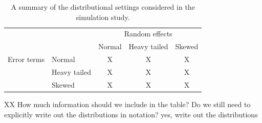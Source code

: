 \documentclass[12pt]{article} %
\newcommand{\hh}[1]{{\color{orange} #1}}
\newcommand{\al}[1]{{\color{red} #1}}
\begin{document}
\begin{table}[htdp]
\centering
\caption{\label{tab:simdsns} A summary of the distributional settings considered in the simulation study.}
\begin{tabular}{llccc}\hline
& & \multicolumn{3}{c}{Random effects} \\ 
           & & Normal & Heavy tailed & Skewed \\ \hline
Error terms  & Normal       & X & X & X \\
             & Heavy tailed & X & X & X \\
             & Skewed       & X & X & X \\ 
\hline
\end{tabular} 
\end{table}
\al{XX How much information should we include in the table? Do we still need to explicitly write out the distributions in notation?}
\hh{yes, write out the distributions}

%
%
\end{document}
